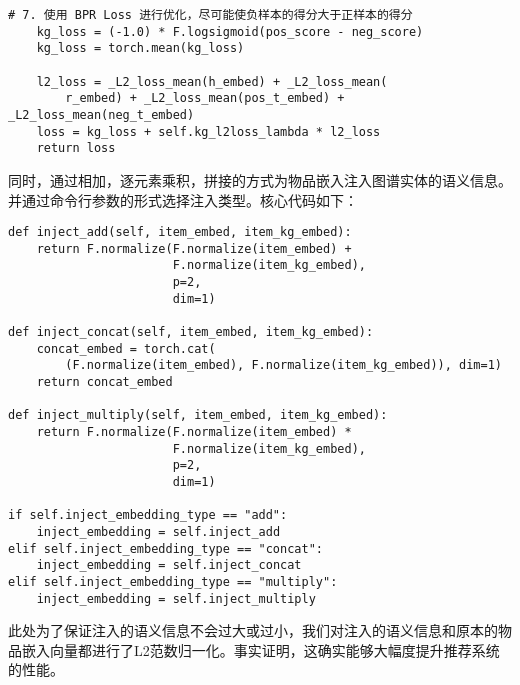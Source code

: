 \documentclass{ctexart}
\begin{document}
\begin{sloppypar}
\begin{lstlisting}[style=python]
    # 7. 使用 BPR Loss 进行优化，尽可能使负样本的得分大于正样本的得分
    kg_loss = (-1.0) * F.logsigmoid(pos_score - neg_score)
    kg_loss = torch.mean(kg_loss)

    l2_loss = _L2_loss_mean(h_embed) + _L2_loss_mean(
        r_embed) + _L2_loss_mean(pos_t_embed) + _L2_loss_mean(neg_t_embed)
    loss = kg_loss + self.kg_l2loss_lambda * l2_loss
    return loss
    \end{lstlisting}

    同时，通过相加，逐元素乘积，拼接的方式为物品嵌入注入图谱实体的语义信息。并通过命令行参数的形式选择注入类型。核心代码如下：

    \begin{lstlisting}[style=python]        
def inject_add(self, item_embed, item_kg_embed):
    return F.normalize(F.normalize(item_embed) +
                       F.normalize(item_kg_embed),
                       p=2,
                       dim=1)

def inject_concat(self, item_embed, item_kg_embed):
    concat_embed = torch.cat(
        (F.normalize(item_embed), F.normalize(item_kg_embed)), dim=1)
    return concat_embed

def inject_multiply(self, item_embed, item_kg_embed):
    return F.normalize(F.normalize(item_embed) *
                       F.normalize(item_kg_embed),
                       p=2,
                       dim=1)

if self.inject_embedding_type == "add":
    inject_embedding = self.inject_add
elif self.inject_embedding_type == "concat":
    inject_embedding = self.inject_concat
elif self.inject_embedding_type == "multiply":
    inject_embedding = self.inject_multiply

    \end{lstlisting}

    此处为了保证注入的语义信息不会过大或过小，我们对注入的语义信息和原本的物品嵌入向量都进行了L2范数归一化。事实证明，这确实能够大幅度提升推荐系统的性能。


\end{sloppypar}
\end{document}
